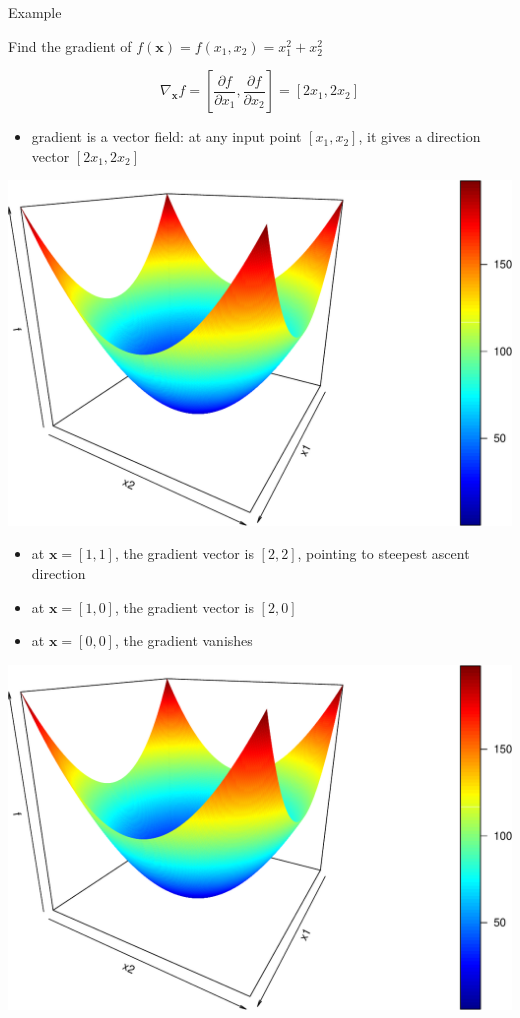 \documentclass{scrartcl}
\def\tightlist{}
\newcommand{\vv}[1]{\boldsymbol{#1}}
\begin{document}
\begin{frame}{Example}
\protect\hypertarget{example-4}{}

Find the gradient of \(f(\vv{x}) = f(x_1, x_2) = x_1^2 +x_2^2\)

\[\nabla_{\vv{x}}f = \left [\frac{\partial f}{\partial x_1}, \frac{\partial f}{\partial x_2}\right ] = [2x_1, 2x_2]\]

\begin{itemize}
\tightlist
\item
  gradient is a vector field: at any input point \([x_1, x_2]\), it
  gives a direction vector \([2x_1, 2x_2]\)
\end{itemize}

\begin{center}\includegraphics[width=0.6\linewidth]{math4ml_files/figure-beamer/unnamed-chunk-12-1} \end{center}

\end{frame}

\begin{frame}{}
\protect\hypertarget{section-6}{}

\begin{itemize}
\tightlist
\item
  at \(\vv{x} = [1,1]\), the gradient vector is \([2,2]\), pointing to
  steepest ascent direction
\item
  at \(\vv{x} = [1,0]\), the gradient vector is \([2,0]\)
\item
  at \(\vv{x} = [0,0]\), the gradient vanishes
\end{itemize}

\begin{center}\includegraphics[width=0.6\linewidth]{math4ml_files/figure-beamer/unnamed-chunk-13-1} \end{center}

\end{frame}
\end{document}
